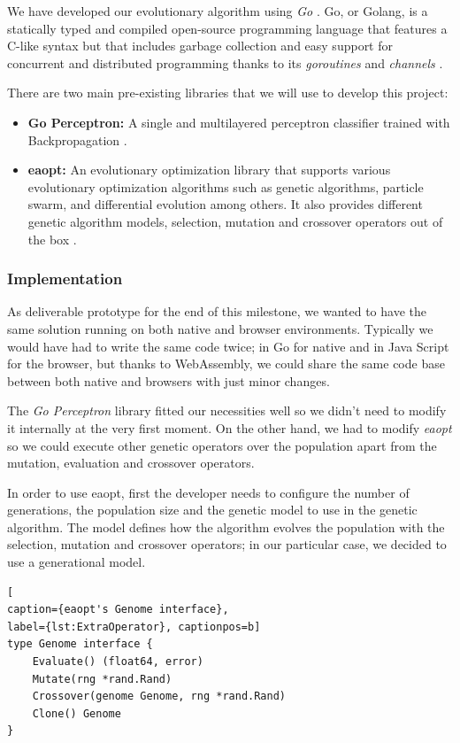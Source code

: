 We have developed our evolutionary algorithm using \textit{Go} \cite{go}. Go, or Golang, is a statically typed and compiled open-source programming language that features a C-like syntax but that includes garbage collection and easy support for concurrent and distributed programming thanks to its \textit{goroutines} \cite{channels} and \textit{channels} \cite{channels}.

There are two main pre-existing libraries that we will use to develop this project:

\begin{itemize}
	\item \textbf{Go Perceptron:} A single and multilayered perceptron classifier trained with Backpropagation \cite{go-perceptron-go}.
	\item \textbf{eaopt:} An evolutionary optimization library that supports various evolutionary optimization algorithms such as genetic algorithms, particle swarm, and differential evolution among others. It also provides different genetic algorithm models, selection, mutation and crossover operators out of the box \cite{eaopt}.
\end{itemize}

\subsubsection*{Implementation}
As deliverable prototype for the end of this milestone, we wanted to have the same solution running on both native and browser environments. Typically we would have had to write the same code twice; in Go for native and in Java Script for the browser, but thanks to WebAssembly, we could share the same code base between both native and browsers with just minor changes.

The \textit{Go Perceptron} library fitted our necessities well so we didn't need to modify it internally at the very first moment. On the other hand, we had to modify \textit{eaopt} so we could execute other genetic operators over the population apart from the mutation, evaluation and crossover operators.

In order to use eaopt, first the developer needs to configure the number of generations, the population size and the genetic model to use in the genetic algorithm. The model defines how the algorithm evolves the population with the selection, mutation and crossover operators; in our particular case, we decided to use a generational model.

\begin{lstlisting}[
caption={eaopt's Genome interface},
label={lst:ExtraOperator}, captionpos=b]
type Genome interface {
	Evaluate() (float64, error)
	Mutate(rng *rand.Rand)
	Crossover(genome Genome, rng *rand.Rand)
	Clone() Genome
}
\end{lstlisting}

